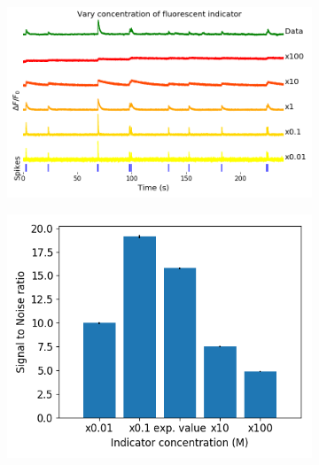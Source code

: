 \documentclass[a4paper,12pt]{article}
\theoremstyle{definition}
\begin{document}
\begin{figure}[p]
\centering
    \begin{subfigure}{0.8\textwidth}
        \includegraphics[width=\linewidth]{figures/indicator_perturbed_fluorescence_18_paper.png}
        \caption{}
    \end{subfigure}
    \newline
    \begin{subfigure}{0.4\textwidth}
        \includegraphics[width=\linewidth]{figures/indicator_perturbed_snr.png}
        \caption{}
    \end{subfigure}
    \begin{subfigure}{0.4\textwidth}

\end{subfigure}
\end{figure}
\end{document}
